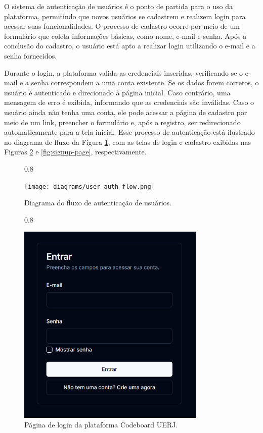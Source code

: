 O sistema de autenticação de usuários é o ponto de partida para o uso da plataforma, permitindo que novos usuários se cadastrem e realizem login para acessar suas funcionalidades. O processo de cadastro ocorre por meio de um formulário que coleta informações básicas, como nome, e-mail e senha. Após a conclusão do cadastro, o usuário está apto a realizar login utilizando o e-mail e a senha fornecidos.

Durante o login, a plataforma valida as credenciais inseridas, verificando se o e-mail e a senha correspondem a uma conta existente. Se os dados forem corretos, o usuário é autenticado e direcionado à página inicial. Caso contrário, uma mensagem de erro é exibida, informando que as credenciais são inválidas. Caso o usuário ainda não tenha uma conta, ele pode acessar a página de cadastro por meio de um link, preencher o formulário e, após o registro, ser redirecionado automaticamente para a tela inicial. Esse processo de autenticação está ilustrado no diagrama de fluxo da Figura \ref{fig:user-auth-flow}, com as telas de login e cadastro exibidas nas Figuras \ref{fig:login-page} e \ref{fig:signup-page}, respectivamente.

\begin{figure}[H]{0.8\textwidth}
    \centering
    \caption{Diagrama do fluxo de autenticação de usuários.}
    \label{fig:user-auth-flow}
    \texttt{[image: diagrams/user-auth-flow.png]}
\end{figure}

\begin{figure}[H]{0.8\textwidth}
    \centering
    \caption{Página de login da plataforma Codeboard UERJ.}
    \label{fig:login-page}
    \includegraphics[width=0.8\textwidth]{assets/codeboard/login-page.png}
\end{figure}

